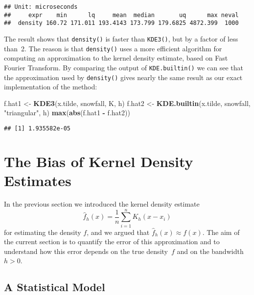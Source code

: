 \documentclass[
  a4paper,
]{article}
\newenvironment{Shaded}{\begin{snugshade}}{\end{snugshade}}
\newcommand{\FunctionTok}[1]{\textcolor[rgb]{0.13,0.29,0.53}{\textbf{#1}}}
\newcommand{\NormalTok}[1]{#1}
\newcommand{\OtherTok}[1]{\textcolor[rgb]{0.56,0.35,0.01}{#1}}
\newcommand{\SpecialCharTok}[1]{\textcolor[rgb]{0.81,0.36,0.00}{\textbf{#1}}}
\newcommand{\StringTok}[1]{\textcolor[rgb]{0.31,0.60,0.02}{#1}}
\theoremstyle{definition}
\theoremstyle{definition}
\theoremstyle{definition}
\theoremstyle{definition}
\theoremstyle{remark}
\begin{document}
\begin{verbatim}
## Unit: microseconds
##     expr    min      lq     mean  median       uq      max neval
##  density 160.72 171.011 193.4143 173.799 179.6825 4872.399  1000
\end{verbatim}

The result shows that \texttt{density()} is faster than \texttt{KDE3()}, but by
a factor of less than~2. The reason is that \texttt{density()} uses a
more efficient algorithm for computing an approximation to
the kernel density estimate, based on Fast Fourier Transform.
By comparing the output of \texttt{KDE.builtin()} we can see that the
approximation used by \texttt{density()} gives nearly the same result as our
exact implementation of the method:

\begin{Shaded}
\begin{Highlighting}[]
\NormalTok{f.hat1 }\OtherTok{\textless{}{-}} \FunctionTok{KDE3}\NormalTok{(x.tilde, snowfall, K, h)}
\NormalTok{f.hat2 }\OtherTok{\textless{}{-}} \FunctionTok{KDE.builtin}\NormalTok{(x.tilde, snowfall, }\StringTok{"triangular"}\NormalTok{, h)}
\FunctionTok{max}\NormalTok{(}\FunctionTok{abs}\NormalTok{(f.hat1 }\SpecialCharTok{{-}}\NormalTok{ f.hat2))}
\end{Highlighting}
\end{Shaded}

\begin{verbatim}
## [1] 1.935582e-05
\end{verbatim}

\clearpage

\section{The Bias of Kernel Density Estimates}\label{X02-Bias}

In the previous section we introduced the kernel density estimate
\begin{equation}
  \hat f_h(x)
  = \frac{1}{n} \sum_{i=1}^n K_h(x - x_i)  \label{eq:KDE-est}
\end{equation}
for estimating the density \(f\), and we argued that \(\hat f_h(x) \approx f(x)\).
The aim of the current section is to quantify the error of this approximation
and to understand how this error depends on the true density~\(f\)
and on the bandwidth~\(h > 0\).

\subsection{A Statistical Model}\label{a-statistical-model}
\end{document}
